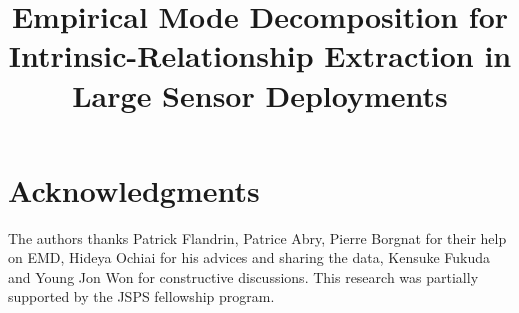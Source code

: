 \documentclass[conference]{IEEEtran}
\begin{document}
\title{Empirical Mode Decomposition for Intrinsic-Relationship Extraction in Large Sensor Deployments}


\author{
\and
{}
\and
{}
}


\maketitle

% 
% 










\section*{Acknowledgments}
The authors thanks Patrick Flandrin, Patrice Abry, Pierre Borgnat for their help on EMD, Hideya Ochiai for his advices and sharing the data, Kensuke Fukuda and Young Jon Won for constructive discussions.
This research was partially supported by the JSPS fellowship program.



\end{document}
